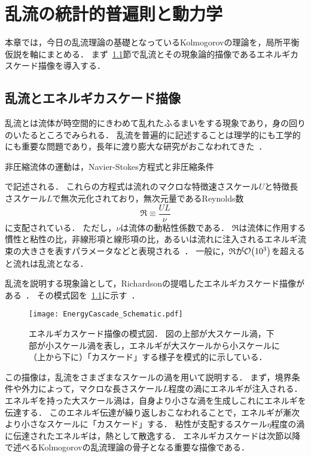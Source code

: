 \chapter{乱流の統計的普遍則と動力学}
\label{chap:StatisticalUniversalityAndDynamicsOfTurbulence}

本章では，今日の乱流理論の基礎となっているKolmogorovの理論を，局所平衡仮説を軸にまとめる．
まず~\ref{sec:TurbulenceAndEnergyCascadePicture}節で乱流とその現象論的描像であるエネルギカスケード描像を導入する．


\section{乱流とエネルギカスケード描像}
\label{sec:TurbulenceAndEnergyCascadePicture}

乱流とは流体が時空間的にきわめて乱れたふるまいをする現象であり，身の回りのいたるところでみられる．
乱流を普遍的に記述することは理学的にも工学的にも重要な問題であり，長年に渡り膨大な研究がおこなわれてきた~\cite{tennekes1972first,Landau1987Fluid,KidaYanase,frisch1995tlk}．

非圧縮流体の運動は，Navier-Stokes方程式と非圧縮条件
で記述される．
これらの方程式は流れのマクロな特徴速さスケール\(U\)と特徴長さスケール\(L\)で無次元化されており，無次元量であるReynolds数
\begin{equation}
  \Re \equiv \frac{UL}{\nu}
  \label{eq:LEHASU_DefOfReynoldsNumber}
\end{equation}
に支配されている．
ただし，\(\nu\)は流体の動粘性係数である．
\(\Re\)は流体に作用する慣性と粘性の比，非線形項と線形項の比，あるいは流れに注入されるエネルギ流束の大きさを表すパラメータなどと表現される~\cite[p.~8，p.~409]{Tatsumi}．
一般に，\(\Re\)が\(\order{10^3}\)を超えると流れは乱流となる．

乱流を説明する現象論として，Richardsonの提唱したエネルギカスケード描像がある~\cite{Goto2017a,GotoJPS2018}．
その模式図を~\ref{fig:EnergyCascade_Schematic.pdf}に示す~\cite{gotolab}．
\begin{figure}[!t]
  \centering
  \texttt{[image: EnergyCascade\_Schematic.pdf]}
  \caption{
    エネルギカスケード描像の模式図．
    図の上部が大スケール渦，下部が小スケール渦を表し，エネルギが大スケールから小スケールに（上から下に）「カスケード」する様子を模式的に示している．}
  \label{fig:EnergyCascade_Schematic.pdf}
\end{figure}
この描像は，乱流をさまざまなスケールの渦を用いて説明する．
まず，境界条件や外力によって，マクロな長さスケール\(L\)程度の渦にエネルギが注入される．
エネルギを持った大スケール渦は，自身より小さな渦を生成しこれにエネルギを伝達する．
このエネルギ伝達が繰り返しおこなわれることで，エネルギが漸次より小さなスケールに「カスケード」する．
粘性が支配するスケール\(\eta\)程度の渦に伝達されたエネルギは，熱として散逸する．
エネルギカスケードは次節以降で述べるKolmogorovの乱流理論の骨子となる重要な描像である．
